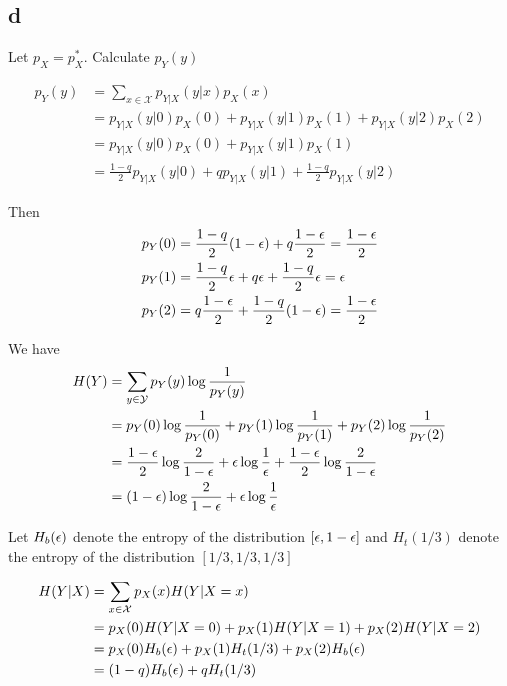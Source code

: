 \documentclass{article}
\begin{document}
\subsection{d}

Let $p_X = p_X^*$. Calculate $p_Y(y)$

\begin{align*}
    p_Y(y)
    &= \sum_{x \in \mathcal{X}} p_{Y|X}(y|x) p_X(x) \\
    &= p_{Y|X}(y|0) p_X(0) + p_{Y|X}(y|1)p_X(1) + p_{Y|X}(y|2)p_X(2) \\
    &= p_{Y|X}(y|0) p_X(0) + p_{Y|X}(y|1)p_X(1) \\
    &= \frac{1-q}{2} p_{Y|X}(y|0) + q p_{Y|X}(y|1) + \frac{1-q}{2} p_{Y|X}(y|2)
\end{align*}

Then
\begin{align*}
    p_Y(0) &= \frac{1-q}{2} (1-\epsilon) + q \frac{1-\epsilon}{2} = \frac{1- \epsilon}{2}\\
    p_Y(1) &= \frac{1-q}{2} \epsilon + q \epsilon + \frac{1-q}{2} \epsilon = \epsilon\\
    p_Y(2) &= q \frac{1-\epsilon}{2} + \frac{1-q}{2} (1-\epsilon) = \frac{1- \epsilon}{2}
\end{align*}

We have
\begin{align*}
    H(Y)
    &= \sum_{y \in \mathcal{Y}} p_Y(y) \log \frac{1}{p_Y(y)} \\
    &= p_Y(0) \log \frac{1}{p_Y(0)} + p_Y(1) \log \frac{1}{p_Y(1)} + p_Y(2) \log \frac{1}{p_Y(2)} \\
    &= \frac{1 - \epsilon}{2} \log \frac{2}{1-\epsilon} + \epsilon \log \frac{1}{\epsilon} + \frac{1 - \epsilon}{2} \log \frac{2}{1-\epsilon} \\
    &= (1 - \epsilon) \log \frac{2}{1-\epsilon} + \epsilon \log \frac{1}{\epsilon}
\end{align*}

Let $H_b(\epsilon)$ denote the entropy of the distribution $[\epsilon, 1-\epsilon]$ and $H_t(1/3)$ denote the entropy of the distribution $[1/3, 1/3, 1/3]$

\begin{align*}
    H(Y|X)
    &= \sum_{x \in \mathcal{X}} p_X(x) H(Y | X=x) \\
    &= p_X(0) H(Y | X=0) + p_X(1) H(Y | X=1) + p_X(2) H(Y | X=2) \\
    &= p_X(0) H_b(\epsilon) + p_X(1) H_t(1/3) + p_X(2) H_b(\epsilon) \\
    &= (1-q) H_b(\epsilon) + q H_t(1/3)
\end{align*}
\end{document}
